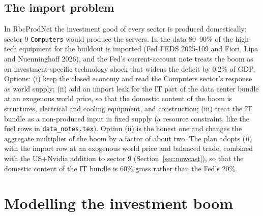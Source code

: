 \documentclass[11pt]{article}
\begin{document}
\subsection{The import problem}
In RbcProdNet the investment good of every sector is produced domestically; sector 9 \texttt{Computers} would produce the servers. In the data 80--90\% of the high-tech equipment for the buildout is imported (Fed FEDS 2025-109 and Fiori, Lipa and Nuenninghoff 2026), and the Fed's current-account note treats the boom as an investment-specific technology shock that widens the deficit by 0.2\% of GDP. Options: (i) keep the closed economy and read the Computers sector's response as world supply; (ii) add an import leak for the IT part of the data center bundle at an exogenous world price, so that the domestic content of the boom is structures, electrical and cooling equipment, and construction; (iii) treat the IT bundle as a non-produced input in fixed supply (a resource constraint, like the fuel rows in \texttt{data\_notes.tex}). Option (ii) is the honest one and changes the aggregate multiplier of the boom by a factor of about two. The plan adopts (ii) with the import row at an exogenous world price and balanced trade, combined with the US+Nvidia addition to sector 9 (Section~\ref{sec:nowcast}), so that the domestic content of the IT bundle is 60\% gross rather than the Fed's 20\%.

\section{Modelling the investment boom}\label{sec:boom}
\end{document}
